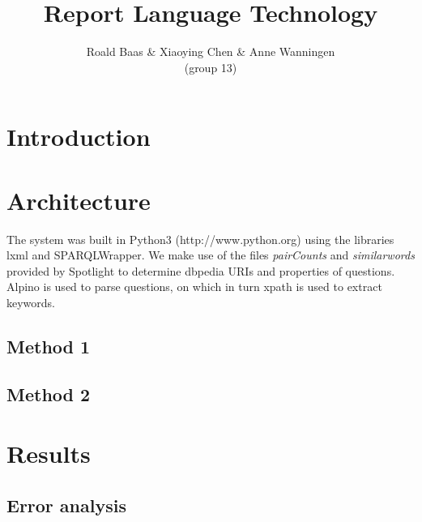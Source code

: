 \documentclass[a4paper,11pt]{article}
\title{Report Language Technology}
\author{Roald Baas \& Xiaoying Chen \& Anne Wanningen\\(group 13)}
\begin{document}


\maketitle

\section{Introduction}



\section{Architecture}
The system was built in Python3 (http://www.python.org) using the libraries lxml and SPARQLWrapper. We make use of the files \emph{pairCounts} and \emph{similarwords} provided by Spotlight \citep{isem2013daiber} to determine dbpedia URIs and properties of questions. Alpino is used to parse questions, on which in turn xpath is used to extract keywords.



\subsection{Method 1}


\subsection{Method 2}



\section{Results}

\subsection{Error analysis}






\end{document}
